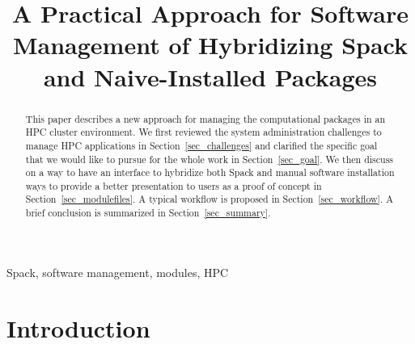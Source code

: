 \documentclass[conference]{IEEEtran}
\begin{document}
\title{A Practical Approach for Software Management of Hybridizing Spack and Naive-Installed Packages\\
}

\author{
\and
{}
}

\maketitle

\begin{abstract}
This paper describes a new approach for managing the computational packages in an HPC cluster environment.
We first reviewed the system administration challenges to manage HPC applications in Section~\ref{sec_challenges} and clarified the specific goal that we would like to pursue for the whole work in Section~\ref{sec_goal}.
We then discuss on a way to have an interface to hybridize both Spack and manual software installation ways to provide a better presentation to users as a proof of concept in Section~\ref{sec_modulefiles}. A typical workflow is proposed in Section~\ref{sec_workflow}.  
A brief conclusion is summarized in Section~\ref{sec_summary}.

\end{abstract}

\begin{IEEEkeywords}
Spack, software management, modules, HPC 
\end{IEEEkeywords}

\section{Introduction}\label{sec_intro}
\end{document}
